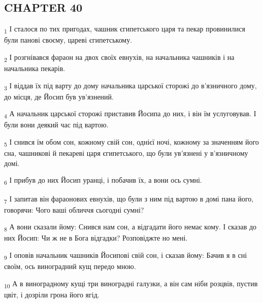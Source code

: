\subsection{CHAPTER 40}
\begin{tcolorbox}
\textsubscript{1} І сталося по тих пригодах, чашник єгипетського царя та пекар провинилися були панові своєму, цареві єгипетському.
\end{tcolorbox}
\begin{tcolorbox}
\textsubscript{2} І розгнівався фараон на двох своїх евнухів, на начальника чашників і на начальника пекарів.
\end{tcolorbox}
\begin{tcolorbox}
\textsubscript{3} І віддав їх під варту до дому начальника царської сторожі до в'язничного дому, до місця, де Йосип був ув'язнений.
\end{tcolorbox}
\begin{tcolorbox}
\textsubscript{4} А начальник царської сторожі приставив Йосипа до них, і він їм услуговував. І були вони деякий час під вартою.
\end{tcolorbox}
\begin{tcolorbox}
\textsubscript{5} І снився їм обом сон, кожному свій сон, однієї ночі, кожному за значенням його сна, чашникові й пекареві царя єгипетського, що були ув'язнені у в'язничному домі.
\end{tcolorbox}
\begin{tcolorbox}
\textsubscript{6} І прибув до них Йосип уранці, і побачив їх, а вони ось сумні.
\end{tcolorbox}
\begin{tcolorbox}
\textsubscript{7} І запитав він фараонових евнухів, що були з ним під вартою в домі пана його, говорячи: Чого ваші обличчя сьогодні сумні?
\end{tcolorbox}
\begin{tcolorbox}
\textsubscript{8} А вони сказали йому: Снився нам сон, а відгадати його немає кому. І сказав до них Йосип: Чи ж не в Бога відгадки? Розповіджте но мені.
\end{tcolorbox}
\begin{tcolorbox}
\textsubscript{9} І оповів начальник чашників Йосипові свій сон, і сказав йому: Бачив я в сні своїм, ось виноградний кущ передо мною.
\end{tcolorbox}
\begin{tcolorbox}
\textsubscript{10} А в виноградному кущі три виноградні галузки, а він сам ніби розцвів, пустив цвіт, і дозріли грона його ягід.
\end{tcolorbox}

